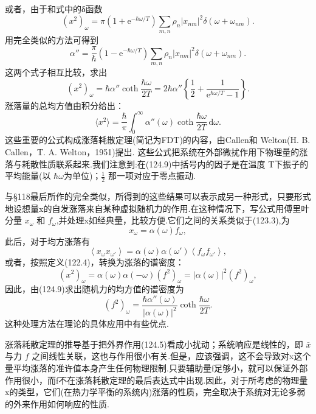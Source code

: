 或者，由于和式中的δ函数
\begin{equation*}
  (x^2)_\omega=\pi(1+\mathrm{e}^{-\hbar\omega/T})\sum_{m,n}\rho_n|x_{nm}|^2
  \delta(\omega+\omega_{nm}).
\end{equation*}
用完全类似的方法可得到
\begin{equation*}
  \alpha''=\frac{\pi}{\hbar}(1-\mathrm{e}^{-\hbar\omega/T})\sum_{m,n}\rho_n|x_{nm}|^2
  \delta(\omega+\omega_{nm}).
\end{equation*}
这两个式子相互比较，求出
\begin{equation}
  (x^2)_\omega=\hbar\alpha''\coth\frac{\hbar\omega}{2T}
  =2\hbar\alpha''\left\{\frac{1}{2}
  +\frac{1}{\mathrm{e}^{\hbar\omega/T}-1}\right\}.
\end{equation}
涨落量的总均方值由积分给出：
\begin{equation}
  \langle x^2\rangle=\frac{\hbar}{\pi}\int_0^{\infty}\alpha''(\omega)
  \coth\frac{\hbar\omega}{2T}\,\mathrm{d}\omega.
\end{equation}
这些重要的公式构成涨落耗散定理(简记为FDT)的内容，由Callen和 Welton(H. B. Callen，T. A. Welton，1951)提出. 这些公式把系统在外部微扰作用下物理量的涨落与耗散性质联系起来.我们注意到:在(124.9)中括号内的因子是在温度 T下振子的平均能量(以 $\hbar\omega$为单位)；$\frac{1}{2}$ 那一项对应于零点振动.

与§118最后所作的完全类似，所得到的这些结果可以表示成另一种形式，只要形式地设想量x的自发涨落来自某种虚拟随机力的作用.在这种情况下，写公式用傅里叶分量 $x_\omega$ 和 $f_\omega$,并处理x如经典量，比较方便.它们之间的关系类似于(123.3),为
\begin{equation}
  x_\omega=\alpha(\omega)f_\omega,
\end{equation}
此后，对于均方涨落有
\begin{equation*}
  \left\langle x_\omega x_{\omega'}\right\rangle
  =\alpha(\omega)\alpha(\omega')\left\langle f_\omega f_{\omega'}\right\rangle,
\end{equation*}
或者，按照定义(122.4)，转换为涨落的谱密度：
\begin{equation*}
  (x^2)_\omega=\alpha(\omega)\alpha(-\omega)(f^2)_\omega
  =|\alpha(\omega)|^2(f^2)_\omega,
\end{equation*}
因此，由(124.9)求出随机力的均方值的谱密度为
\begin{equation}
  (f^2)_\omega=\frac{\hbar\alpha''(\omega)}{|\alpha(\omega)|^2}
  \coth\frac{\hbar\omega}{2T}.
\end{equation}
这种处理方法在理论的具体应用中有些优点.

涨落耗散定理的推导基于把外界作用(124.5)看成小扰动；系统响应是线性的，即 $\bar{x}$ 与力 $f$ 之间线性关联，这也与作用很小有关.但是，应该强调，这不会导致对x这个量平均涨落的准许值本身产生任何物理限制.只要辅助量f足够小，就可以保证外部作用很小，而f不在涨落耗散定理的最后表达式中出现.因此，对于所考虑的物理量x的类型，它们(在热力学平衡的系统内)涨落的性质，完全取决于系统对无论多弱的外来作用如何响应的性质.

